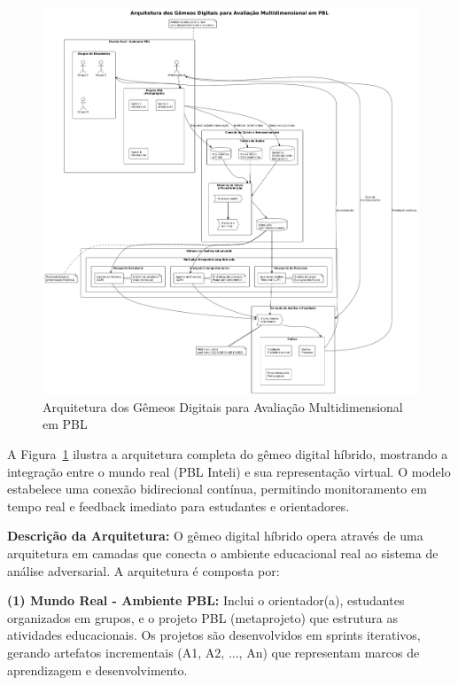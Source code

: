 \documentclass[english, spanish, brazilian]{modelo_dt}
\begin{document}
\begin{figure}[htbp]
  \centering
  \includegraphics[width=\linewidth,height=0.8\textheight,keepaspectratio]{assets/f1.png}
  \caption{Arquitetura dos Gêmeos Digitais para Avaliação Multidimensional em PBL}
  \label{fig:gemeo-digital-pbl}
\end{figure}

A Figura~\ref{fig:gemeo-digital-pbl} ilustra a arquitetura completa do gêmeo
digital híbrido, mostrando a integração entre o mundo real (PBL Inteli) e sua
representação virtual. O modelo estabelece uma conexão bidirecional contínua,
permitindo monitoramento em tempo real e feedback imediato para estudantes e
orientadores\@.

\textbf{Descrição da Arquitetura:} O gêmeo digital híbrido opera através de uma arquitetura em camadas que conecta o ambiente educacional real ao sistema de análise adversarial. A arquitetura é composta por:

\textbf{(1) Mundo Real - Ambiente PBL:} Inclui o orientador(a), estudantes organizados em grupos, e o projeto PBL (metaprojeto) que estrutura as atividades educacionais. Os projetos são desenvolvidos em sprints iterativos, gerando artefatos incrementais (A1, A2, ..., An) que representam marcos de aprendizagem e desenvolvimento\@.
\end{document}
